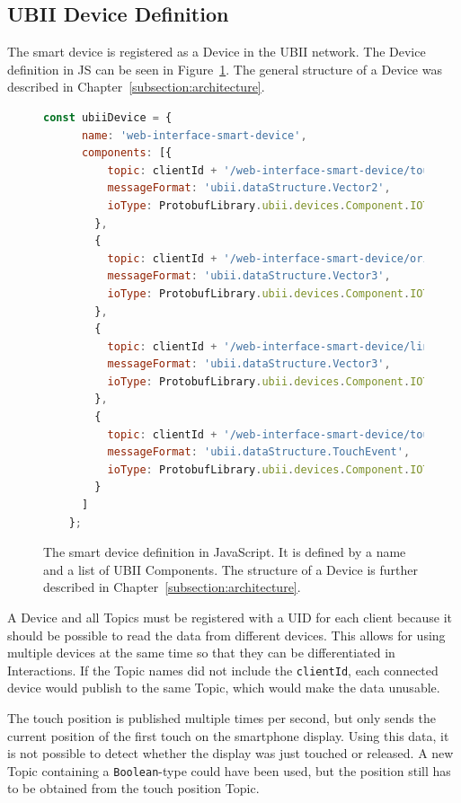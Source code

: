 \subsection{UBII Device Definition}\label{subsection:ubii-device-definition}

The smart device is registered as a Device in the \gls{UBII} network. The Device definition in \gls{JS} can be seen in Figure~\ref{fig:ubii-device-registration}. The general structure of a Device was described in Chapter~\ref{subsection:architecture}.

\begin{figure}[H]
	\begin{lstlisting}[language=JavaScript]
    const ubiiDevice = {
      name: 'web-interface-smart-device',
      components: [{
          topic: clientId + '/web-interface-smart-device/touch_position',
          messageFormat: 'ubii.dataStructure.Vector2',
          ioType: ProtobufLibrary.ubii.devices.Component.IOType.INPUT
        },
        {
          topic: clientId + '/web-interface-smart-device/orientation',
          messageFormat: 'ubii.dataStructure.Vector3',
          ioType: ProtobufLibrary.ubii.devices.Component.IOType.INPUT
        },
        {
          topic: clientId + '/web-interface-smart-device/linear_acceleration',
          messageFormat: 'ubii.dataStructure.Vector3',
          ioType: ProtobufLibrary.ubii.devices.Component.IOType.INPUT
        },
        {
          topic: clientId + '/web-interface-smart-device/touch_events',
          messageFormat: 'ubii.dataStructure.TouchEvent',
          ioType: ProtobufLibrary.ubii.devices.Component.IOType.INPUT
        }
      ]
    };
  \end{lstlisting}
	\caption[Protobuf definition of the smart device]{The smart device definition in JavaScript. It is defined by a name and a list of \gls{UBII} Components. The structure of a Device is further described in Chapter~\ref{subsection:architecture}.}\label{fig:ubii-device-registration}
\end{figure}

A Device and all Topics must be registered with a \gls{UID} for each client because it should be possible to read the data from different devices. This allows for using multiple devices at the same time so that they can be differentiated in Interactions. If the Topic names did not include the \lstinline{clientId}, each connected device would publish to the same Topic, which would make the data unusable.

The touch position is published multiple times per second, but only sends the current position of the first touch on the smartphone display. Using this data, it is not possible to detect whether the display was just touched or released. A new Topic containing a \lstinline{Boolean}-type could have been used, but the position still has to be obtained from the touch position Topic.

